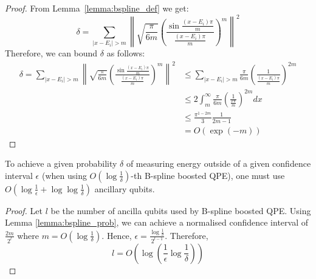 \begin{proof}
From Lemma~\ref{lemma:bspline_def} we get:
\begin{equation}
     \delta = \sum_{|x - E_i| > m} \left\| \sqrt{\frac{\pi}{6m}}\left(\frac{\sin \frac{(x-E_i)\pi}{m}}{ \frac{(x-E_i)\pi}{m}}\right)^m \right\|^2
\end{equation}
Therefore, we can bound $\delta$ as follows:
    \begin{align}
        \delta = \sum_{|x - E_i| > m} \left\| \sqrt{\frac{\pi}{6m}}\left(\frac{\sin \frac{(x-E_i)\pi}{m}}{ \frac{(x-E_i)\pi}{m}}\right)^m \right\|^2 &\leq \sum_{|x - E_i| > m} \frac{\pi}{6m}\left(\frac{1}{ \frac{(x-E_i)\pi}{m}}\right)^{2m} \\
        &\leq 2\int_{m}^{\infty} \frac{\pi}{6m}\left(\frac{1}{ \frac{x\pi}{m}}\right)^{2m} dx\\
        &\leq  \frac{ \pi^{1-2m}}{3} \frac{1}{2m -1}\\
        &= O\left(\exp (-m)\right)
    \end{align}
\end{proof}
\begin{duplicate}
To achieve a given probability $\delta$ of measuring energy outside of a given confidence interval $\epsilon$ (when using $O(\log \frac{1}{\delta})$-th B-spline boosted QPE), one must use $O(\log \frac{1}{\epsilon} + \log \log \frac{1}{\delta})$ ancillary qubits.
\end{duplicate}
\begin{proof}
Let $l$ be the number of ancilla qubits used by B-spline boosted QPE. Using Lemma \ref{lemma:bspline_prob}, we can achieve a normalised confidence interval of $\frac{2m}{2^l}$ where $m = O(\log \frac{1}{\delta})$. Hence, $\epsilon = \frac{\log \frac{1}{\delta}}{2^{l-1}}$. Therefore,
\begin{equation*}
    l = O\left(\log \left(\frac{1}{\epsilon}\log \frac{1}{\delta}\right)\right)
\end{equation*}
\end{proof}
